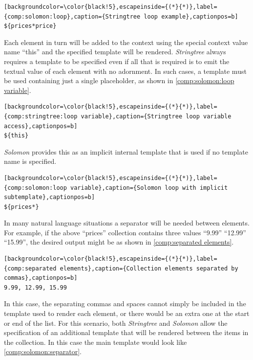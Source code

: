 \begin{lstlisting}[backgroundcolor=\color{black!5},escapeinside={(*}{*)},label={comp:solomon:loop},caption={Stringtree loop example},captionpos=b]
${prices*price}
\end{lstlisting}

Each element in turn will be added to the context using the special context value name \enquote{this} and the specified template will be rendered. \emph{Stringtree} always requires a template to be specified even if all that is required is to emit the textual value of each element with no adornment. In such cases, a template must be used containing just a single placeholder, as shown in \autoref{comp:solomon:loop variable}.

\begin{lstlisting}[backgroundcolor=\color{black!5},escapeinside={(*}{*)},label={comp:stringtree:loop variable},caption={Stringtree loop variable access},captionpos=b]
${this}
\end{lstlisting}

\emph{Solomon} provides this as an implicit internal template that is used if no template name is specified.

\begin{lstlisting}[backgroundcolor=\color{black!5},escapeinside={(*}{*)},label={comp:solomon:loop variable},caption={Solomon loop with implicit subtemplate},captionpos=b]
${prices*}
\end{lstlisting}

In many natural language situations a separator will be needed between elements. For example, if the above \enquote{prices} collection contains three values \enquote{9.99} \enquote{12.99} \enquote{15.99}, the desired output might be as shown in \autoref{comp:separated elements}.

\begin{lstlisting}[backgroundcolor=\color{black!5},escapeinside={(*}{*)},label={comp:separated elements},caption={Collection elements separated by commas},captionpos=b]
9.99, 12.99, 15.99
\end{lstlisting}

In this case, the separating commas and spaces cannot simply be included in the template used to render each element, or there would be an extra one at the start or end of the list. For this scenario, both \emph{Stringtree} and \emph{Solomon} allow the specification of an additional template that will be rendered between the items in the collection. In this case the main template would look like \autoref{comp:solomon:separator}.

